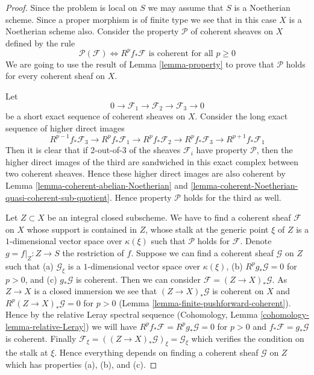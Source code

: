 \begin{proof}
Since the problem is local on $S$ we may assume that $S$ is
a Noetherian scheme. Since a proper morphism is of finite type
we see that in this case $X$ is a Noetherian scheme also.
Consider the property $\mathcal{P}$ of coherent sheaves
on $X$ defined by the rule
$$
\mathcal{P}(\mathcal{F}) \Leftrightarrow
R^pf_*\mathcal{F}\text{ is coherent for all }p \geq 0
$$
We are going to use the result of
Lemma \ref{lemma-property} to prove that
$\mathcal{P}$ holds for every coherent sheaf on $X$.

\medskip\noindent
Let
$$
0 \to \mathcal{F}_1 \to \mathcal{F}_2 \to \mathcal{F}_3 \to 0
$$
be a short exact sequence of coherent sheaves on $X$.
Consider the long exact sequence of higher direct images
$$
R^{p - 1}f_*\mathcal{F}_3 \to
R^pf_*\mathcal{F}_1 \to
R^pf_*\mathcal{F}_2 \to
R^pf_*\mathcal{F}_3 \to
R^{p + 1}f_*\mathcal{F}_1
$$
Then it is clear that if 2-out-of-3 of the sheaves $\mathcal{F}_i$
have property $\mathcal{P}$, then the higher direct images of the
third are sandwiched in this exact complex between two coherent
sheaves. Hence these higher direct images are also coherent by
Lemma \ref{lemma-coherent-abelian-Noetherian} and
\ref{lemma-coherent-Noetherian-quasi-coherent-sub-quotient}.
Hence property $\mathcal{P}$ holds for the third as well.

\medskip\noindent
Let $Z \subset X$ be an integral closed subscheme.
We have to find a coherent sheaf $\mathcal{F}$ on $X$ whose support is
contained in $Z$, whose stalk at the generic point $\xi$ of $Z$ is a
$1$-dimensional vector space over $\kappa(\xi)$ such that $\mathcal{P}$
holds for $\mathcal{F}$. Denote $g = f|_Z : Z \to S$ the restriction of $f$.
Suppose we can find a coherent sheaf $\mathcal{G}$ on $Z$ such
that
(a) $\mathcal{G}_\xi$ is a $1$-dimensional vector space over $\kappa(\xi)$,
(b) $R^pg_*\mathcal{G} = 0$ for $p > 0$, and
(c) $g_*\mathcal{G}$ is coherent. Then we can consider
$\mathcal{F} = (Z \to X)_*\mathcal{G}$. As $Z \to X$ is a closed immersion
we see that $(Z \to X)_*\mathcal{G}$ is coherent on $X$
and $R^p(Z \to X)_*\mathcal{G} = 0$ for $p > 0$
(Lemma \ref{lemma-finite-pushforward-coherent}).
Hence by the relative Leray spectral sequence
(Cohomology, Lemma \ref{cohomology-lemma-relative-Leray})
we will have $R^pf_*\mathcal{F} = R^pg_*\mathcal{G} = 0$ for $p > 0$
and $f_*\mathcal{F} = g_*\mathcal{G}$ is coherent.
Finally $\mathcal{F}_\xi = ((Z \to X)_*\mathcal{G})_\xi = \mathcal{G}_\xi$
which verifies the condition on the stalk at $\xi$.
Hence everything depends on finding a coherent sheaf $\mathcal{G}$
on $Z$ which has properties (a), (b), and (c).


\end{proof}
